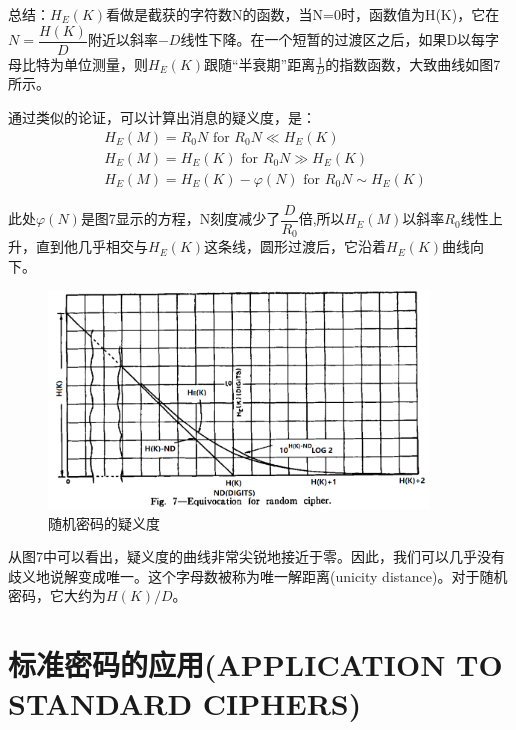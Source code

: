 \documentclass[]{article}
\begin{document}
总结：$H_E(K)$看做是截获的字符数N的函数，当N=0时，函数值为H(K)，它在$N=\dfrac{H(K)}{D}$附近以斜率$-D$线性下降。在一个短暂的过渡区之后，如果D以每字母比特为单位测量，则$H_E(K)$跟随“半衰期”距离$\frac{1}{D}$的指数函数，大致曲线如图7所示。

通过类似的论证，可以计算出消息的疑义度，是：
\begin{align*}
	&H_E(M) = R_0 N \text{ for } R_0N \ll H_E(K)\\
	&H_E(M) = H_E(K) \text{ for } R_0N \gg H_E(K)\\
	&H_E(M) = H_E(K)-\varphi(N) \text{ for } R_0N \sim H_E(K)
\end{align*}


此处$\varphi(N)$是图7显示的方程，N刻度减少了$\dfrac{D}{R_0}$倍,所以$H_E(M)$以斜率$R_0$线性上升，直到他几乎相交与$H_E(K)$这条线，圆形过渡后，它沿着$H_E(K)$曲线向下。

\begin{figure}[htbp]
	\centering
	\includegraphics[width=0.9\textwidth]{fig7.png}
	\caption{随机密码的疑义度}
	\label{fig:fig7}
\end{figure}

从图7中可以看出，疑义度的曲线非常尖锐地接近于零。因此，我们可以几乎没有歧义地说解变成唯一。这个字母数被称为唯一解距离(unicity distance)。对于随机密码，它大约为$H(K)/D$。

\newpage
%   
%

\section{标准密码的应用(APPLICATION TO STANDARD CIPHERS)}
\end{document}
